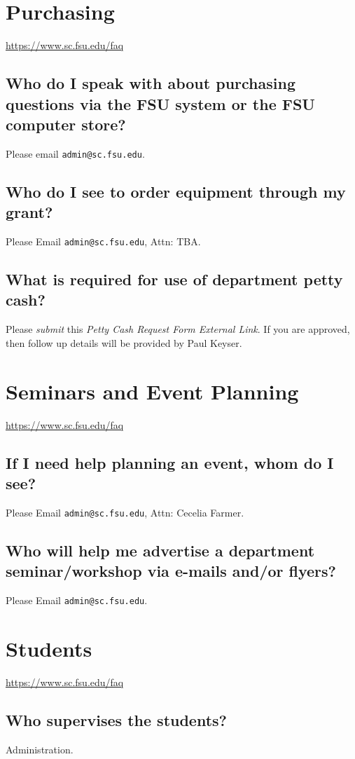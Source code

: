 \documentclass[12pt,a4paper]{article}
\begin{document}
\section{Purchasing}
\url{https://www.sc.fsu.edu/faq}
\subsection{Who do I speak with about purchasing questions via the FSU system or the FSU computer store?}
Please email \texttt{admin@sc.fsu.edu}.

\subsection{Who do I see to order equipment through my grant?}
Please Email \texttt{admin@sc.fsu.edu}, Attn: TBA.

\subsection{What is required for use of department petty cash?}
Please \textit{submit} this \textit{Petty Cash Request Form External Link}. If you are approved, then follow up details will be provided by Paul Keyser.

\section{Seminars and Event Planning}
\url{https://www.sc.fsu.edu/faq}
\subsection{If I need help planning an event, whom do I see?}
Please Email \texttt{admin@sc.fsu.edu}, Attn: Cecelia Farmer.

\subsection{Who will help me advertise a department seminar/workshop via e-mails and/or flyers?}
Please Email \texttt{admin@sc.fsu.edu}.

\section{Students}
\url{https://www.sc.fsu.edu/faq}
\subsection{Who supervises the students?}
Administration.
\end{document}
